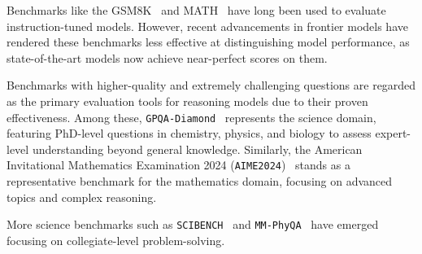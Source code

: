 \iffalse
{
Benchmarks like the GSM8K~\cite{cobbe2021training} and MATH~\cite{hendrycks2021measuring} have long been used to evaluate instruction-tuned models. However, recent advancements in frontier models have rendered these benchmarks less effective at distinguishing model performance, as state-of-the-art models now achieve near-perfect scores on them. 

Benchmarks with higher-quality and extremely challenging questions are regarded as the primary evaluation tools for reasoning models due to their proven effectiveness. Among these, \texttt{GPQA-Diamond}~\cite{rein2023gpqa} represents the science domain, featuring PhD-level questions in chemistry, physics, and biology to assess expert-level understanding beyond general knowledge. Similarly, the American Invitational Mathematics Examination 2024 (\texttt{AIME2024})~\cite{MAAInvitational2024} stands as a representative benchmark for the mathematics domain, focusing on advanced topics and complex reasoning.

More science benchmarks such as \texttt{SCIBENCH}~\cite{wang2023scibench} and \texttt{MM-PhyQA}~\cite{anand2024mm} have emerged focusing on collegiate-level problem-solving.

}
